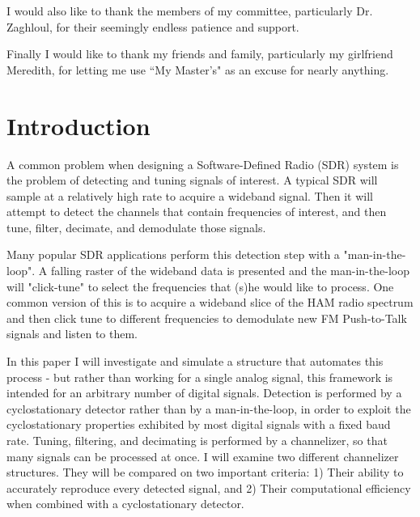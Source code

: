 \documentclass[12pt,dvips]{report}
\begin{document}
I would also like to thank the members of my committee, particularly Dr.
Zaghloul, for their seemingly endless patience and support.

Finally I would like to thank my friends and family, particularly my girlfriend Meredith, for letting me use ``My Master's" as an excuse for nearly anything.

\tableofcontents
\pagebreak

\listoffigures
\pagebreak

\listoftables
\pagebreak

\pagestyle{myheadings}

\chapter{Introduction}
\label{sec:intro}

A common problem when designing a Software-Defined Radio (SDR) system is the problem of detecting and tuning signals of interest. A typical SDR will sample at a relatively high rate to acquire a wideband signal. Then it will attempt to detect the channels that contain frequencies of interest, and then tune, filter, decimate, and demodulate those signals. 

Many popular SDR applications perform this detection step with a "man-in-the-loop".  A falling raster of the wideband data is presented and the man-in-the-loop will "click-tune" to select  the frequencies that (s)he would like to process. One common version of this is to acquire a wideband slice of the HAM radio spectrum and then click tune to different frequencies to demodulate new FM Push-to-Talk signals and listen to them.

In this paper I will investigate and simulate a structure that automates this process - but rather than working for a single analog signal, this framework is intended for an arbitrary number of digital signals. Detection is performed by a cyclostationary detector rather than by a man-in-the-loop, in order to exploit the cyclostationary properties exhibited by most digital signals with a fixed baud rate.  Tuning, filtering, and decimating is performed by a channelizer, so that many signals can be processed at once.  I will examine two different channelizer structures. They will be compared on two important criteria: 1) Their ability to accurately reproduce every detected signal, and 2) Their computational efficiency when combined with a cyclostationary detector.
\end{document}
